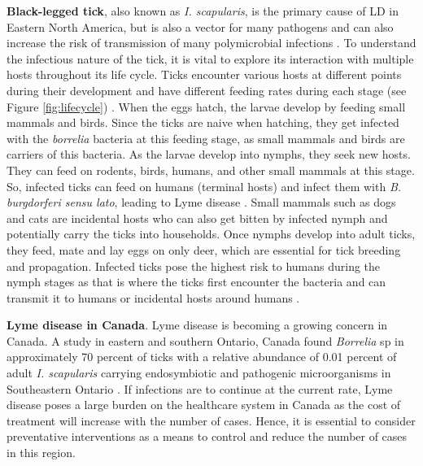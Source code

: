 \documentclass[12pt, centerh1]{article}
\newcommand{\sophie}[1]{{\textcolor{purple}{$\langle$SS: #1$\rangle$}}}
\newcommand{\thanesh}[1]{{\textcolor{yellow}{$\langle$TR: #1$\rangle$}}}
\begin{document}
\textbf{Black-legged tick}, also known as \textit{I. scapularis}, is the primary cause of LD in Eastern North America, but is also a vector for many pathogens and can also increase the risk %
of transmission of many polymicrobial infections \citep{paulson2023multiomics}. To understand the infectious nature of the tick, it is vital to explore its interaction with multiple hosts throughout its life cycle. Ticks encounter various hosts at different points during their development and have different feeding rates during each stage (see Figure \ref{fig:lifecycle}) \citep{CDC_2022, radolf2012ticks}. When the eggs hatch, the larvae develop by feeding small mammals and birds. Since the ticks are naive when hatching, they get infected with the \textit{borrelia} bacteria at this feeding stage, as small mammals and birds are carriers of this bacteria.
As the larvae develop into nymphs, they seek new hosts. They can feed on rodents, birds, humans, and other small mammals at this stage. So, infected ticks can feed on humans (terminal hosts) and infect them with \textit{B. burgdorferi sensu lato}, leading to Lyme disease \citep{radolf2012ticks}. 
Small mammals such as dogs and cats are incidental hosts who can also get bitten by infected nymph and potentially carry the ticks into households. Once nymphs develop into adult ticks, they feed, mate and lay eggs on only deer, which are essential for tick breeding and propagation. Infected ticks pose the highest risk to humans during the nymph stages as that is where the ticks first encounter the bacteria and can transmit it to humans or incidental hosts around humans \citep{radolf2012ticks}. 

\textbf{Lyme disease in Canada}.
Lyme disease is becoming a growing concern in Canada. A study in eastern and southern Ontario, Canada found \textit{Borrelia} sp in approximately 70 percent of ticks with a relative abundance of 0.01 percent of adult \textit{I. scapularis} carrying endosymbiotic and pathogenic microorganisms in Southeastern Ontario \citep{paulson2023multiomics} \citep{clow2018microbiota}. If infections are to continue at the current rate, Lyme disease poses a large burden on the healthcare system in Canada as the cost of treatment will increase with the number of cases. Hence, it is essential to consider preventative interventions as a means to control and reduce the number of cases in this region. 
\end{document}
